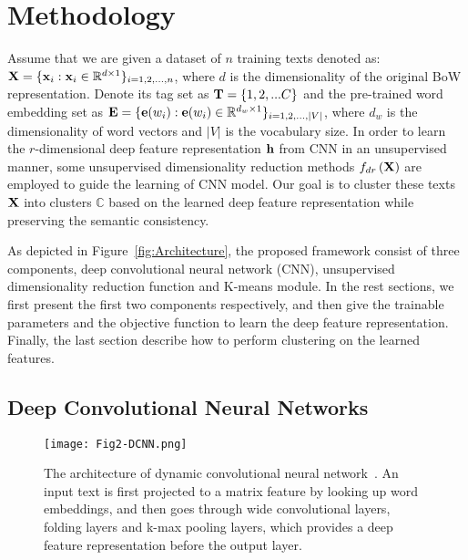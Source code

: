 \documentclass[review]{elsarticle}
\begin{document}
\section{Methodology}
\label{sec:Methodology}
  Assume that we are given a dataset of \(n\) training texts denoted as: \({\bf{X}} = {\{ {{\bf{x}}_i}:{{\bf{x}}_i} \in {\mathbb{R}^{d \times 1}}\} _{i = 1,2,...,n}}\), where \(d\) is the dimensionality of the original BoW representation. Denote its tag set as \({\bf{T}} = \{ 1,2,...C\} \) and the pre-trained word embedding set as \({\bf{E}} = {\{ {\bf{e}}({w_i}):{\bf{e}}({w_i}) \in {\mathbb{R}^{{d_w} \times 1}}\} _{i = 1,2,...,|V|}}\), where \(d_w\) is the dimensionality of word vectors and $|V|$ is the vocabulary size. In order to learn the \(r\)-dimensional deep feature representation \({\bf{h}}\) from CNN in an unsupervised manner, some unsupervised dimensionality reduction methods \({f_{dr}}\left( {\bf{X}} \right)\) are employed to guide the learning of CNN model. Our goal is to cluster these texts \({\bf{X}}\) into clusters \(\mathbb{C}\) based on the learned deep feature representation while preserving the semantic consistency.

As depicted in Figure~\ref{fig:Architecture}, the proposed framework consist of three components, deep convolutional neural network (CNN), unsupervised dimensionality reduction function and K-means module. In the rest sections, we first present the first two components respectively, and then give the trainable parameters and the objective function to learn the deep feature representation. Finally, the last section describe how to perform clustering on the learned features.

\subsection{Deep Convolutional Neural Networks}


\begin{figure}[t]
\begin{center}
\texttt{[image: Fig2-DCNN.png]}
\caption{The architecture of dynamic convolutional neural network~\cite{16_blunsom2014convolutional}. An input text is first projected to a matrix feature by looking up word embeddings, and then goes through wide convolutional layers, folding layers and k-max pooling layers, which provides a deep feature representation before the output layer.}\label{fig:DCNN}
\end{center}
\end{figure}
\end{document}
